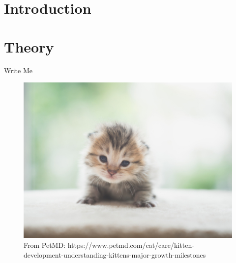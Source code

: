 \section{Introduction}

\section{Theory}

Write Me

\begin{figure}
  \includegraphics[width=1.0\columnwidth]{kitten.jpg}
  \caption[A cute kitten]{From PetMD: https://www.petmd.com/cat/care/kitten-development-understanding-kittens-major-growth-milestones\cite{cute_kitten}}
\end{figure}
